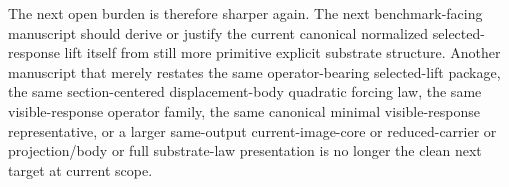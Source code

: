 \documentclass[11pt]{article}
\begin{document}
The next open burden is therefore sharper again. The next benchmark-facing manuscript should derive or justify the current canonical normalized selected-response lift itself from still more primitive explicit substrate structure. Another manuscript that merely restates the same operator-bearing selected-lift package, the same section-centered displacement-body quadratic forcing law, the same visible-response operator family, the same canonical minimal visible-response representative, or a larger same-output current-image-core or reduced-carrier or projection/body or full substrate-law presentation is no longer the clean next target at current scope.
\end{document}
